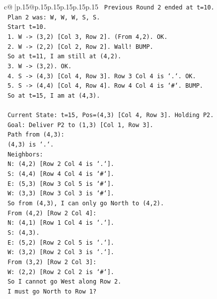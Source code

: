 \documentclass{article}
\begin{document}
{\begin{supertabular}{c@{$\;$}|p{.15\linewidth}@{}p{.15\linewidth}p{.15\linewidth}p{.15\linewidth}p{.15\linewidth}p{.15\linewidth}}
{{{\texttt{   Previous Round 2 ended at t=10.} \\
\texttt{   Plan 2 was: W, W, W, S, S.} \\
\texttt{   Start t=10.} \\
\texttt{   1. W {-}> (3,2) {[}Col 3, Row 2{]}. (From 4,2). OK.} \\
\texttt{   2. W {-}> (2,2) {[}Col 2, Row 2{]}. Wall! BUMP.} \\
\texttt{   So at t=11, I am still at (4,2).} \\
\texttt{   3. W {-}> (3,2). OK.} \\
\texttt{   4. S {-}> (4,3) {[}Col 4, Row 3{]}. Row 3 Col 4 is `.`. OK.} \\
\texttt{   5. S {-}> (4,4) {[}Col 4, Row 4{]}. Row 4 Col 4 is `\#`. BUMP.} \\
\texttt{   So at t=15, I am at (4,3).} \\
\\ 
\texttt{   Current State: t=15, Pos=(4,3) {[}Col 4, Row 3{]}. Holding P2.} \\
\texttt{   Goal: Deliver P2 to (1,3) {[}Col 1, Row 3{]}.} \\
\texttt{   Path from (4,3):} \\
\texttt{   (4,3) is `.`.} \\
\texttt{   Neighbors:} \\
\texttt{   N: (4,2) {[}Row 2 Col 4 is `.`{]}.} \\
\texttt{   S: (4,4) {[}Row 4 Col 4 is `\#`{]}.} \\
\texttt{   E: (5,3) {[}Row 3 Col 5 is `\#`{]}.} \\
\texttt{   W: (3,3) {[}Row 3 Col 3 is `\#`{]}.} \\
\texttt{   So from (4,3), I can only go North to (4,2).} \\
\texttt{   From (4,2) {[}Row 2 Col 4{]}:} \\
\texttt{   N: (4,1) {[}Row 1 Col 4 is `.`{]}.} \\
\texttt{   S: (4,3).} \\
\texttt{   E: (5,2) {[}Row 2 Col 5 is `.`{]}.} \\
\texttt{   W: (3,2) {[}Row 2 Col 3 is `.`{]}.} \\
\texttt{   From (3,2) {[}Row 2 Col 3{]}:} \\
\texttt{   W: (2,2) {[}Row 2 Col 2 is `\#`{]}.} \\
\texttt{   So I cannot go West along Row 2.} \\
\texttt{   I must go North to Row 1?} \\
}}}
\end{supertabular}}
\end{document}
